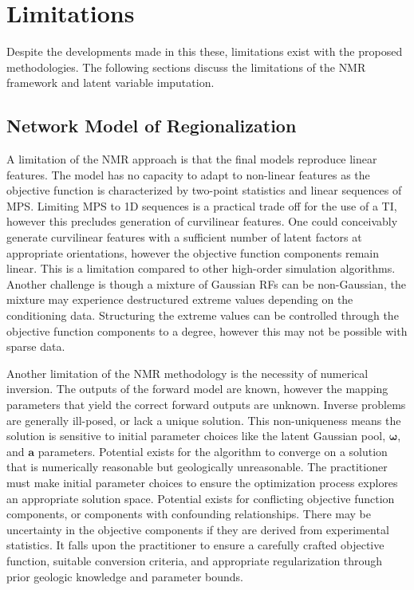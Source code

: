 \FloatBarrier
\section{Limitations}
\label{sec:07limit}

Despite the developments made in this these, limitations exist with the proposed methodologies. The following sections discuss the limitations of the \gls{NMR} framework and latent variable imputation.

\subsection{Network Model of Regionalization}
\label{subsec:07nmr2}

A limitation of the \gls{NMR} approach is that the final models reproduce linear features. The model has no capacity to adapt to non-linear features as the objective function is characterized by two-point statistics and linear sequences of \gls{MPS}. Limiting \gls{MPS} to \gls{1D} sequences is a practical trade off for the use of a \gls{TI}, however this precludes generation of curvilinear features. One could conceivably generate curvilinear features with a sufficient number of latent factors at appropriate orientations, however the objective function components remain linear. This is a limitation compared to other high-order simulation algorithms. Another challenge is though a mixture of Gaussian \glspl{RF} can be non-Gaussian, the mixture may experience destructured extreme values depending on the conditioning data. Structuring the extreme values can be controlled through the objective function components to a degree, however this may not be possible with sparse data.

Another limitation of the \gls{NMR} methodology is the necessity of numerical inversion. The outputs of the forward model are known, however the mapping parameters that yield the correct forward outputs are unknown. Inverse problems are generally ill-posed, or lack a unique solution. This non-uniqueness means the solution is sensitive to initial parameter choices like the latent Gaussian pool, $\pmb{\omega}$, and $\pmb{a}$ parameters. Potential exists for the algorithm to converge on a solution that is numerically reasonable but geologically unreasonable. The practitioner must make initial parameter choices to ensure the optimization process explores an appropriate solution space. Potential exists for conflicting objective function components, or components with confounding relationships. There may be uncertainty in the objective components if they are derived from experimental statistics. It falls upon the practitioner to ensure a carefully crafted objective function, suitable conversion criteria, and appropriate regularization through prior geologic knowledge and parameter bounds.

